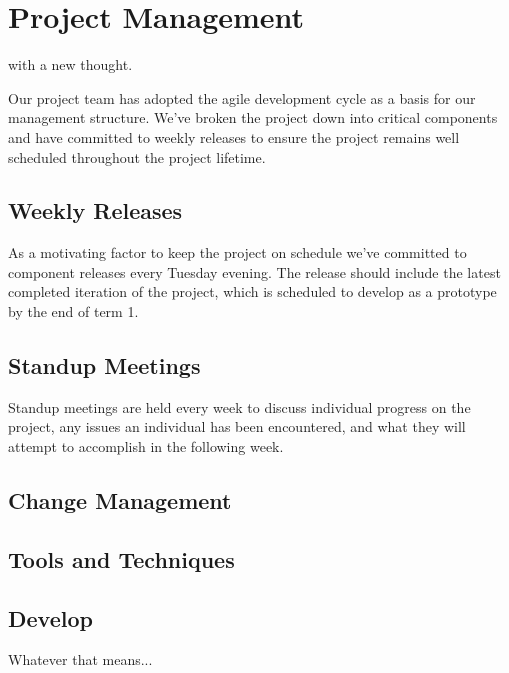 \chapter[Project Management]{Project Management}
\label{ch:management}


 with a new thought.

Our project team has adopted the agile development cycle as a basis for our management structure. We've broken the project down into critical components and have committed to weekly releases to ensure the project remains well scheduled throughout the project lifetime.




\section{Weekly Releases}
As a motivating factor to keep the project on schedule we've committed to component releases every Tuesday evening. The release should include the latest completed iteration of the project, which is scheduled to develop as a prototype by the end of term 1.

\section{Standup Meetings}
Standup meetings are held every week to discuss individual progress on the project, any issues an individual has been encountered, and what they will attempt to accomplish in the following week.

\section{Change Management}

\section{Tools and Techniques}

\section{Develop}

Whatever that means...